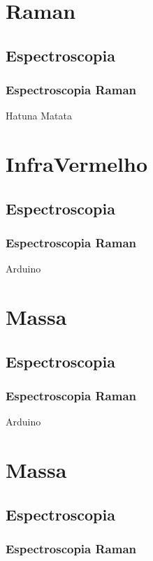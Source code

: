 \documentclass[11pt, twoside]{book}
\begin{document}
\frontmatter

	\pagestyle{fancy}
	\tableofcontents
	\listoffigures
	\listoftables
 
\mainmatter

	\chapter{Raman}
		\section{Espectroscopia}
			\subsection{Espectroscopia Raman}
   				Hatuna Matata \cite{linux}
	  
	\chapter{InfraVermelho}
		\section{Espectroscopia}
			\subsection{Espectroscopia Raman}
   				Arduino \cite{LaTeX}
   
	\chapter{Massa}
		\section{Espectroscopia}
			\subsection{Espectroscopia Raman}
   				Arduino \cite{css}

\appendix

	\chapter{Massa}
		\section{Espectroscopia}
			\subsection{Espectroscopia Raman}

\backmatter

\printindex
\end{document}

